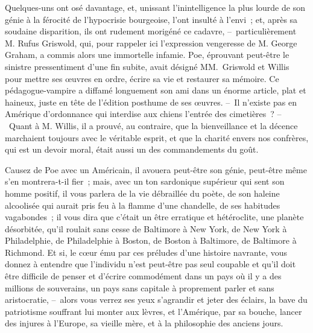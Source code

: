 \documentclass[french,twoside]{book} %
\begin{document}
\hspace{1em}Quelques-uns ont osé davantage, et, unissant l’inintelligence la plus lourde de son génie à la férocité de l’hypocrisie bourgeoise, l’ont insulté à l’envi ; et, après sa soudaine disparition, ils ont rudement morigéné ce cadavre, – particulièrement M. Rufus Griswold, qui, pour rappeler ici l’expression vengeresse de M. George Graham, a commis alors une immortelle infamie. Poe, éprouvant peut-être le sinistre pressentiment d’une fin subite, avait désigné MM. Griswold et Willis pour mettre ses œuvres en ordre, écrire sa vie et restaurer sa mémoire. Ce pédagogue-vampire a diffamé longuement son ami dans un énorme article, plat et haineux, juste en tête de l’édition posthume de ses œuvres. – Il n’existe pas en Amérique d’ordonnance qui interdise aux chiens l’entrée des cimetières ? – Quant à M. Willis, il a prouvé, au contraire, que la bienveillance et la décence marchaient toujours avec le véritable esprit, et que la charité envers nos confrères, qui est un devoir moral, était aussi un des commandements du goût.\par
Causez de Poe avec un Américain, il avouera peut-être son génie, peut-être même s’en montrera-t-il fier ; mais, avec un ton sardonique supérieur qui sent son homme positif, il vous parlera de la vie débraillée du poète, de son haleine alcoolisée qui aurait pris feu à la flamme d’une chandelle, de ses habitudes vagabondes ; il vous dira que c’était un être erratique et hétéroclite, une planète désorbitée, qu’il roulait sans cesse de Baltimore à New York, de New York à Philadelphie, de Philadelphie à Boston, de Boston à Baltimore, de Baltimore à Richmond. Et si, le cœur ému par ces préludes d’une histoire navrante, vous donnez à entendre que l’individu n’est peut-être pas seul coupable et qu’il doit être difficile de penser et d’écrire commodément dans un pays où il y a des millions de souverains, un pays sans capitale à proprement parler et sans aristocratie, – alors vous verrez ses yeux s’agrandir et jeter des éclairs, la bave du patriotisme souffrant lui monter aux lèvres, et l’Amérique, par sa bouche, lancer des injures à l’Europe, sa vieille mère, et à la philosophie des anciens jours.\par
\end{document}
